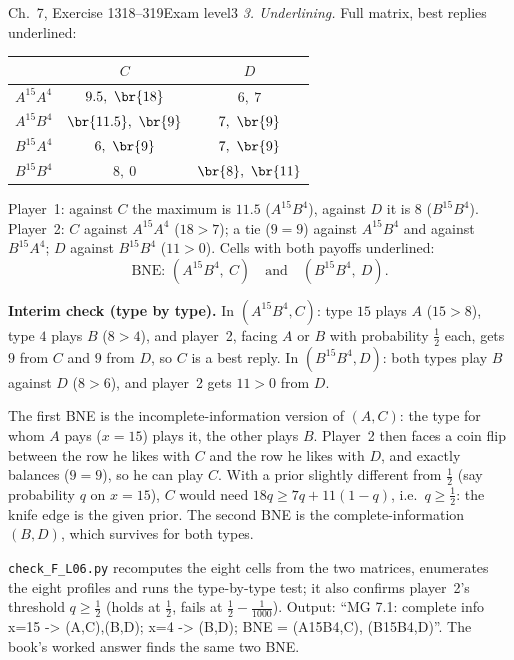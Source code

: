 \begin{exsol}{\MG{} Ch.~7, Exercise 1}{318--319}{Exam level}{3}
\emph{3. Underlining.} Full matrix, best replies underlined:
\begin{center}
\begin{tabular}{l|cc}
 & $C$ & $D$\\\hline
$A^{15}A^{4}$ & $9.5,\ \br{18}$ & $6,\ 7$\\
$A^{15}B^{4}$ & $\br{11.5},\ \br{9}$ & $7,\ \br{9}$\\
$B^{15}A^{4}$ & $6,\ \br{9}$ & $7,\ \br{9}$\\
$B^{15}B^{4}$ & $8,\ 0$ & $\br{8},\ \br{11}$
\end{tabular}
\end{center}
Player~1: against $C$ the maximum is $11.5$ ($A^{15}B^{4}$), against $D$ it is $8$ ($B^{15}B^{4}$).
Player~2: $C$ against $A^{15}A^{4}$ ($18 > 7$); a tie ($9 = 9$) against $A^{15}B^{4}$ and against
$B^{15}A^{4}$; $D$ against $B^{15}B^{4}$ ($11 > 0$). Cells with both payoffs underlined:
\[
  \text{BNE: } (A^{15}B^{4},\ C) \quad\text{and}\quad (B^{15}B^{4},\ D).
\]

\textbf{Interim check (type by type).} In $(A^{15}B^{4}, C)$: type $15$ plays $A$ ($15 > 8$), type $4$
plays $B$ ($8 > 4$), and player~2, facing $A$ or $B$ with probability $\frac12$ each, gets $9$ from $C$
and $9$ from $D$, so $C$ is a best reply. In $(B^{15}B^{4}, D)$: both types play $B$ against $D$
($8 > 6$), and player~2 gets $11 > 0$ from $D$.

\interp The first BNE is the incomplete-information version of $(A,C)$: the type for whom $A$
pays ($x = 15$) plays it, the other plays $B$. Player~2 then faces a coin flip between the row he
likes with $C$ and the row he likes with $D$, and exactly balances ($9 = 9$), so he can play $C$.
With a prior slightly different from $\frac12$ (say probability $q$ on $x = 15$), $C$ would need
$18q \ge 7q + 11(1-q)$, i.e.\ $q \ge \frac12$: the knife edge is the given prior. The second BNE is
the complete-information $(B,D)$, which survives for both types.

\verify \texttt{check\_F\_L06.py} recomputes the eight cells from the two matrices, enumerates the
eight profiles and runs the type-by-type test; it also confirms player~2's threshold $q \ge \frac12$
(holds at $\frac12$, fails at $\frac12 - \frac1{1000}$). Output: ``MG 7.1: complete info x=15 -> (A,C),(B,D);
x=4 -> (B,D); BNE = (A15B4,C), (B15B4,D)''. The book's worked answer finds the same two BNE.


\end{exsol}
